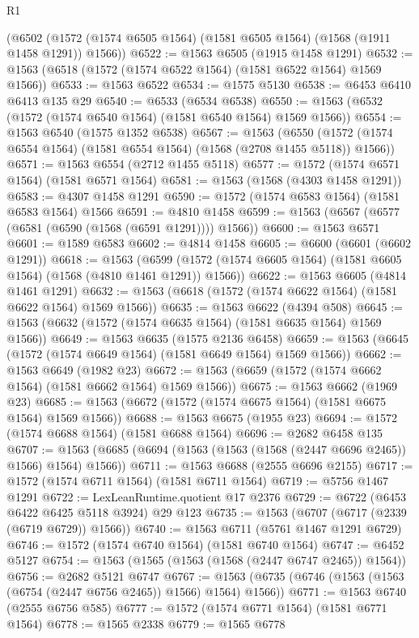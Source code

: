 \begin{lexlean}{R1}
\begin{coremodule}
    (@6502 (@1572 (@1574 @6505 @1564) (@1581 @6505 @1564) (@1568 (@1911 @1458 @1291)) @1566))
@6522 := @1563 @6505 (@1915 @1458 @1291)
@6532 := @1563 (@6518 (@1572 (@1574 @6522 @1564) (@1581 @6522 @1564) @1569 @1566))
@6533 := @1563 @6522
@6534 := @1575 @5130
@6538 := @6453 @6410 @6413 @135 @29
@6540 := @6533 (@6534 @6538)
@6550 := @1563 (@6532 (@1572 (@1574 @6540 @1564) (@1581 @6540 @1564) @1569 @1566))
@6554 := @1563 @6540 (@1575 @1352 @6538)
@6567 := @1563
    (@6550 (@1572 (@1574 @6554 @1564) (@1581 @6554 @1564) (@1568 (@2708 @1455 @5118)) @1566))
@6571 := @1563 @6554 (@2712 @1455 @5118)
@6577 := @1572 (@1574 @6571 @1564) (@1581 @6571 @1564)
@6581 := @1563 (@1568 (@4303 @1458 @1291))
@6583 := @4307 @1458 @1291
@6590 := @1572 (@1574 @6583 @1564) (@1581 @6583 @1564) @1566
@6591 := @4810 @1458
@6599 := @1563 (@6567 (@6577 (@6581 (@6590 (@1568 (@6591 @1291)))) @1566))
@6600 := @1563 @6571
@6601 := @1589 @6583
@6602 := @4814 @1458
@6605 := @6600 (@6601 (@6602 @1291))
@6618 := @1563
    (@6599 (@1572 (@1574 @6605 @1564) (@1581 @6605 @1564) (@1568 (@4810 @1461 @1291)) @1566))
@6622 := @1563 @6605 (@4814 @1461 @1291)
@6632 := @1563 (@6618 (@1572 (@1574 @6622 @1564) (@1581 @6622 @1564) @1569 @1566))
@6635 := @1563 @6622 (@4394 @508)
@6645 := @1563 (@6632 (@1572 (@1574 @6635 @1564) (@1581 @6635 @1564) @1569 @1566))
@6649 := @1563 @6635 (@1575 @2136 @6458)
@6659 := @1563 (@6645 (@1572 (@1574 @6649 @1564) (@1581 @6649 @1564) @1569 @1566))
@6662 := @1563 @6649 (@1982 @23)
@6672 := @1563 (@6659 (@1572 (@1574 @6662 @1564) (@1581 @6662 @1564) @1569 @1566))
@6675 := @1563 @6662 (@1969 @23)
@6685 := @1563 (@6672 (@1572 (@1574 @6675 @1564) (@1581 @6675 @1564) @1569 @1566))
@6688 := @1563 @6675 (@1955 @23)
@6694 := @1572 (@1574 @6688 @1564) (@1581 @6688 @1564)
@6696 := @2682 @6458 @135
@6707 := @1563 (@6685 (@6694 (@1563 (@1563 (@1568 (@2447 @6696 @2465)) @1566) @1564) @1566))
@6711 := @1563 @6688 (@2555 @6696 @2155)
@6717 := @1572 (@1574 @6711 @1564) (@1581 @6711 @1564)
@6719 := @5756 @1467 @1291
@6722 := LexLeanRuntime.quotient @17 @2376
@6729 := @6722 (@6453 @6422 @6425 @5118 @3924) @29 @123
@6735 := @1563 (@6707 (@6717 (@2339 (@6719 @6729)) @1566))
@6740 := @1563 @6711 (@5761 @1467 @1291 @6729)
@6746 := @1572 (@1574 @6740 @1564) (@1581 @6740 @1564)
@6747 := @6452 @5127
@6754 := @1563 (@1565 (@1563 (@1568 (@2447 @6747 @2465)) @1564))
@6756 := @2682 @5121 @6747
@6767 := @1563 (@6735 (@6746 (@1563 (@1563 (@6754 (@2447 @6756 @2465)) @1566) @1564) @1566))
@6771 := @1563 @6740 (@2555 @6756 @585)
@6777 := @1572 (@1574 @6771 @1564) (@1581 @6771 @1564)
@6778 := @1565 @2338
@6779 := @1565 @6778

\end{coremodule}
\end{lexlean}
